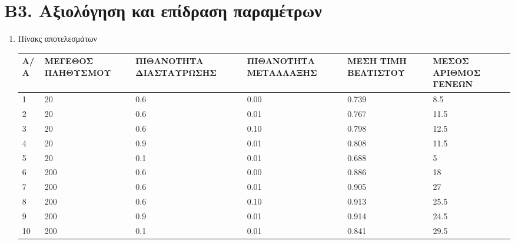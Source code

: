 \documentclass[12pt,a4paper]{article}
\begin{document}
            \section*{Β3. Αξιολόγηση και επίδραση παραμέτρων}
                \begin{enumerate}


                    \item Πίνακς αποτελεσμάτων \\
                     \begin{tabular}{|p{2em}| p{7em} | p{7em} | p{8em} | p{6.5em} | p{6em} | }
                        \hline
                        \textbf{Α/Α} & \textbf{ΜΕΓΕΘΟΣ ΠΛΗΘΥΣΜΟΥ} &
                        \textbf{ΠΙΘΑΝΟΤΗΤΑ
                            ΔΙΑΣΤΑΥΡΩΣΗΣ} & \textbf{ΠΙΘΑΝΟΤΗΤΑ
                        ΜΕΤΑΛΛΑΞΗΣ} & \textbf{ΜΕΣΗ ΤΙΜΗ ΒΕΛΤΙΣΤΟΥ} & \textbf{ΜΕΣΟΣ
                    ΑΡΙΘΜΟΣ ΓΕΝΕΩΝ}\\
                        \hline
                        1  & 20  & 0.6 & 0.00 & 0.739 & 8.5  \\
                        \hline
                        2  & 20  & 0.6 & 0.01 & 0.767 & 11.5  \\
                        \hline
                        3  & 20  & 0.6 & 0.10 & 0.798 & 12.5 \\
                        \hline
                        4  & 20  & 0.9 & 0.01 & 0.808 & 11.5 \\
                        \hline
                        5  & 20  & 0.1 & 0.01 & 0.688 & 5 \\
                        \hline
                        6  & 200 & 0.6 & 0.00 & 0.886 & 18 \\
                        \hline
                        7  & 200 & 0.6 & 0.01 & 0.905 & 27 \\
                        \hline
                        8  & 200 & 0.6 & 0.10 & 0.913 & 25.5 \\
                        \hline
                        9  & 200 & 0.9 & 0.01 & 0.914 & 24.5 \\
                        \hline
                        10 & 200 & 0.1 & 0.01 & 0.841 & 29.5 \\
                        \hline
                \end{tabular}


\end{enumerate}
\end{document}
